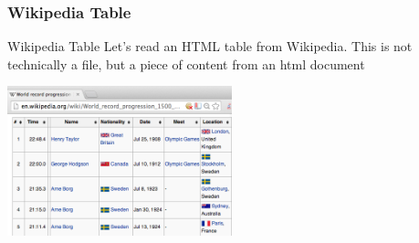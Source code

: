 \documentclass{beamer}\usepackage[]{graphicx}\usepackage[]{color}
\begin{document}

\begin{frame}[fragile]
\frametitle{Wikipedia Table}

\begin{block}{Wikipedia Table}
Let's read an HTML table from Wikipedia. This is not technically a file, but a piece of content from an html document

\begin{center}
\includegraphics[width=6.5cm]{images/wikipedia_table.png}

\end{center}

\end{block}

\end{frame}

\end{document}
